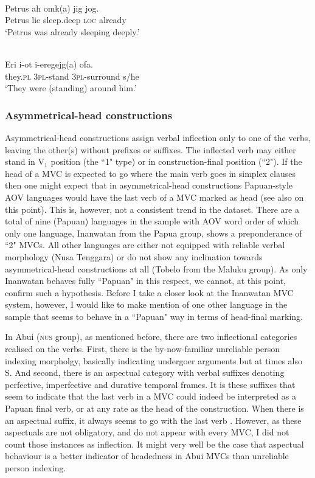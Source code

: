 \ea 
{}\\
\gll Petrus ah omk(a) jig jog. \\
Petrus lie sleep.deep \textsc{loc} already \\
\glft `Petrus was already sleeping deeply.’ \\ 
\z

\ea 
{}\\
\gll Eri i-ot i-eregejg(a) ofa. \\
they.\textsc{pl} 3\textsc{pl}-stand 3\textsc{pl}-surround s/he \\
\glft `They were (standing) around him.’\\ 
\z

\subsubsection{Asymmetrical-head constructions} \label{sec:asymmetrical}

Asymmetrical-head constructions assign verbal inflection only to one of the verbs, leaving the other(s) without prefixes or suffixes. The inflected verb may either stand in V$_1$ position (the ``1" type) or in construction-final position (``2"). If the head of a MVC is expected to go where the main verb goes in simplex clauses then one might expect that in asymmetrical-head constructions Papuan-style AOV languages would have the last verb of a MVC marked as head (see also \citealt{Durie1997} on this point). This is, however, not a consistent trend in the dataset. There are a total of nine (Papuan) languages in the sample with AOV word order of which only one language, Inanwatan from the Papua group, shows a preponderance of ``2" MVCs. All other languages are either not equipped with reliable verbal morphology (Nusa Tenggara) or do not show any inclination towards asymmetrical-head constructions at all (Tobelo from the Maluku group). As only Inanwatan behaves fully ``Papuan" in this respect, we cannot, at this point, confirm such a hypothesis. Before I take a closer look at the Inanwatan MVC system, however, I would like to make mention of one other language in the sample that seems to behave in a ``Papuan" way in terms of head-final marking.

In Abui (\textsc{nus} group), as mentioned before, there are two inflectional categories realised on the verbs. First, there is the by-now-familiar unreliable person indexing morpholgy, basically indicating undergoer arguments but at times also S. And second, there is an aspectual category with verbal suffixes denoting perfective, imperfective and durative temporal frames. It is these suffixes that seem to indicate that the last verb in a MVC could indeed be interpreted as a Papuan final verb, or at any rate as the head of the construction. When there is an aspectual suffix, it always seems to go with the last verb \citep[350]{kratochvil2007grammar}. However, as these aspectuals are not obligatory, and do not appear with every MVC, I did not count those instances as inflection. It might very well be the case that aspectual behaviour is a better indicator of headedness in Abui MVCs than unreliable person indexing.  

